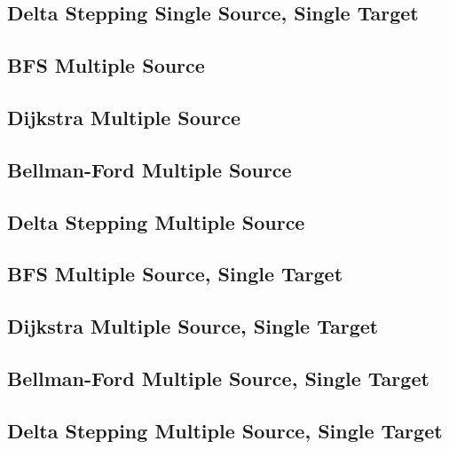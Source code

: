 \subsection{Delta Stepping Single Source, Single Target}

\subsection{BFS Multiple Source}
\subsection{Dijkstra Multiple Source}
\subsection{Bellman-Ford Multiple Source}
\subsection{Delta Stepping Multiple Source}

\subsection{BFS Multiple Source, Single Target}
\subsection{Dijkstra Multiple Source, Single Target}
\subsection{Bellman-Ford Multiple Source, Single Target}
\subsection{Delta Stepping Multiple Source, Single Target}

\begin{comment}
\end{comment}




